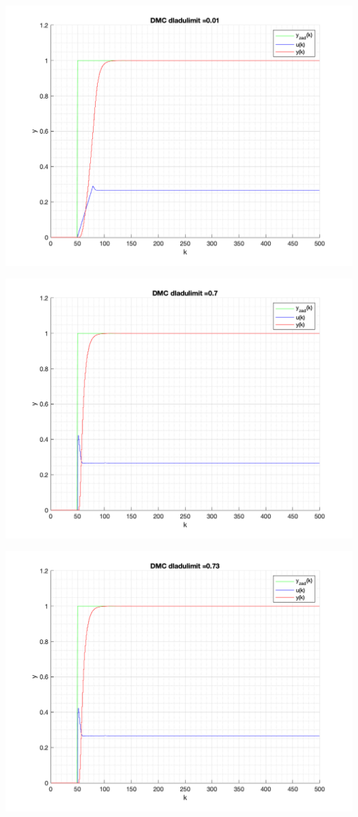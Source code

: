 \documentclass[a4paper, 11pt]{article}
\begin{document}
\begin{enumerate}
 \includegraphics[width=\linewidth]{./ModelsP6_dulimit/P4_DMC_dulimit_0_01_png.png} 
 
 \includegraphics[width=\linewidth]{./ModelsP6_dulimit/P4_DMC_dulimit_0_7_png.png} 
 
 \includegraphics[width=\linewidth]{./ModelsP6_dulimit/P4_DMC_dulimit_0_73_png.png} 
 

\end{enumerate}
\end{document}
